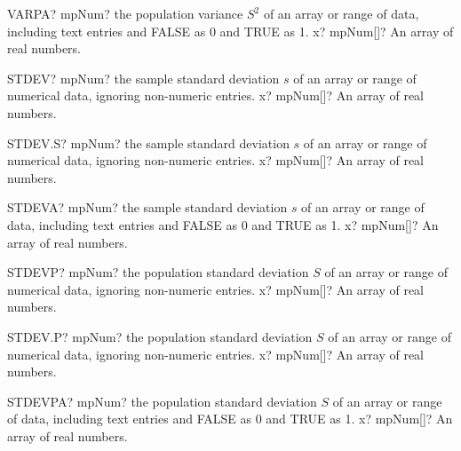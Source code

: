 \documentclass[12pt,a4paper,openany]{book}
\begin{document}
\begin{mpFunctionsExtract}
\mpWorksheetFunctionOneNotImplemented
{VARPA? mpNum? the population variance $S^2$ of an array or range of data, including text entries and FALSE as 0 and TRUE as 1.}
{x? mpNum[]? An array of real numbers.}
\end{mpFunctionsExtract}

\begin{mpFunctionsExtract}
\mpWorksheetFunctionOneNotImplemented
{STDEV? mpNum? the sample standard deviation $s$ of an array or range of numerical data, ignoring non-numeric entries.}
{x? mpNum[]? An array of real numbers.}
\end{mpFunctionsExtract}

\begin{mpFunctionsExtract}
\mpWorksheetFunctionOneNotImplemented
{STDEV.S? mpNum? the sample standard deviation $s$ of an array or range of numerical data, ignoring non-numeric entries.}
{x? mpNum[]? An array of real numbers.}
\end{mpFunctionsExtract}

\begin{mpFunctionsExtract}
\mpWorksheetFunctionOneNotImplemented
{STDEVA? mpNum? the sample standard deviation $s$ of an array or range of data, including text entries and FALSE as 0 and TRUE as 1.}
{x? mpNum[]? An array of real numbers.}
\end{mpFunctionsExtract}

\begin{mpFunctionsExtract}
\mpWorksheetFunctionOneNotImplemented
{STDEVP? mpNum? the population standard deviation $S$ of an array or range of numerical data, ignoring non-numeric entries.}
{x? mpNum[]? An array of real numbers.}
\end{mpFunctionsExtract}

\begin{mpFunctionsExtract}
\mpWorksheetFunctionOneNotImplemented
{STDEV.P? mpNum? the population standard deviation $S$ of an array or range of numerical data, ignoring non-numeric entries.}
{x? mpNum[]? An array of real numbers.}
\end{mpFunctionsExtract}

\begin{mpFunctionsExtract}
\mpWorksheetFunctionOneNotImplemented
{STDEVPA? mpNum? the population standard deviation $S$ of an array or range of data, including text entries and FALSE as 0 and TRUE as 1.}
{x? mpNum[]? An array of real numbers.}
\end{mpFunctionsExtract}
\end{document}
